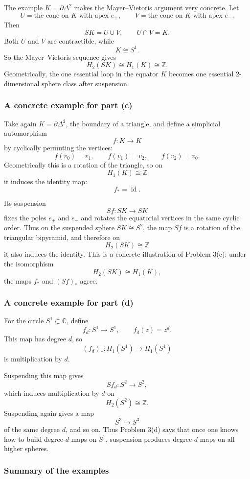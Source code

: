 \documentclass[12pt,a4paper]{article}
\theoremstyle{notespace}
\begin{document}
The example \(K=\partial\Delta^2\) makes the Mayer--Vietoris argument very concrete. Let
\[
U=\text{the cone on }K\text{ with apex }e_+,
\qquad
V=\text{the cone on }K\text{ with apex }e_-.
\]
Then
\[
SK=U\cup V,
\qquad
U\cap V=K.
\]
Both \(U\) and \(V\) are contractible, while
\[
K\cong S^1.
\]
So the Mayer--Vietoris sequence gives
\[
H_2(SK)\cong H_1(K)\cong \mathbb Z.
\]
Geometrically, the one essential loop in the equator \(K\) becomes one essential \(2\)-dimensional sphere class after suspension.

\subsubsection*{A concrete example for part (c)}

Take again \(K=\partial\Delta^2\), the boundary of a triangle, and define a simplicial automorphism
\[
f:K\to K
\]
by cyclically permuting the vertices:
\[
f(v_0)=v_1,\qquad
f(v_1)=v_2,\qquad
f(v_2)=v_0.
\]
Geometrically this is a rotation of the triangle, so on
\[
H_1(K)\cong \mathbb Z
\]
it induces the identity map:
\[
f_*=\operatorname{id}.
\]

Its suspension
\[
Sf:SK\to SK
\]
fixes the poles \(e_+\) and \(e_-\) and rotates the equatorial vertices in the same cyclic order. Thus on the suspended sphere \(SK\cong S^2\), the map \(Sf\) is a rotation of the triangular bipyramid, and therefore on
\[
H_2(SK)\cong \mathbb Z
\]
it also induces the identity. This is a concrete illustration of Problem \(3\)(c): under the isomorphism
\[
H_2(SK)\cong H_1(K),
\]
the maps \(f_*\) and \((Sf)_*\) agree.

\subsubsection*{A concrete example for part (d)}

For the circle \(S^1\subset \mathbb C\), define
\[
f_d:S^1\to S^1,
\qquad
f_d(z)=z^d.
\]
This map has degree \(d\), so
\[
(f_d)_*:H_1(S^1)\to H_1(S^1)
\]
is multiplication by \(d\).

Suspending this map gives
\[
Sf_d:S^2\to S^2,
\]
which induces multiplication by \(d\) on
\[
H_2(S^2)\cong \mathbb Z.
\]
Suspending again gives a map
\[
S^3\to S^3
\]
of the same degree \(d\), and so on. Thus Problem \(3\)(d) says that once one knows how to build degree-\(d\) maps on \(S^1\), suspension produces degree-\(d\) maps on all higher spheres.

\subsubsection*{Summary of the examples}
\end{document}
